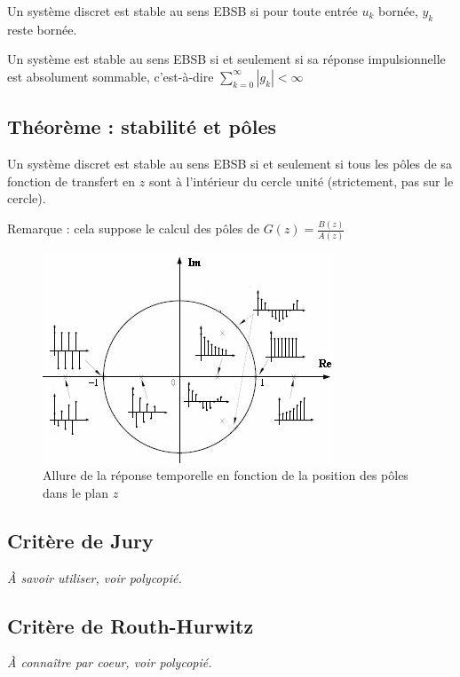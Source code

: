 \documentclass[main.tex]{subfiles}
\begin{document}
\begin{defin}
Un système discret est stable au sens EBSB si pour toute entrée $u_k$ bornée, $y_k$ reste bornée.
\end{defin}

\begin{thm}
Un système est stable au sens EBSB si et seulement si sa réponse impulsionnelle est absolument sommable, c'est-à-dire $\sum_ {k=0}^{\infty}|g_k|<\infty$
\end{thm}


\subsection*{Théorème : stabilité et pôles}
\begin{thm}
Un système discret est stable au sens EBSB si et seulement si tous les pôles de sa fonction de transfert en $z$ sont à l'intérieur du cercle unité (strictement, pas sur le cercle).
\end{thm}

Remarque : cela suppose le calcul des pôles de $G(z) = \frac{B(z)}{A(z)}$

\begin{figure}[h!]
\centering
\includegraphics[scale=0.8]{polesenz.jpg}
\caption{Allure de la réponse temporelle en fonction de la position des pôles dans le plan $z$}
\end{figure}

\subsection*{Critère de Jury}
\emph{À savoir utiliser, voir polycopié.}

\subsection*{Critère de Routh-Hurwitz}
\emph{À connaître par coeur, voir polycopié.}\\
\end{document}
